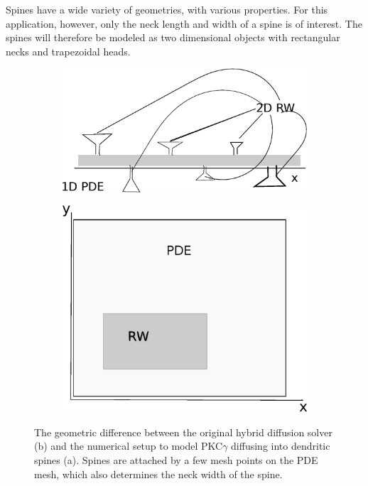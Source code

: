 \noindent Spines have a wide variety of geometries, with various properties. For this application, however, only the neck length and width of a spine is of interest. The spines will therefore be modeled as two dimensional objects with rectangular necks and trapezoidal heads. 
\begin{figure}[H]
 \centering
 \begin{subfigure}{0.48\textwidth}
  \includegraphics[width=\textwidth]{Figures/dendrite_spine_model.eps}
  \caption{}
 \end{subfigure}
 \begin{subfigure}{0.48\textwidth}
  \includegraphics[width=\textwidth]{Figures/hybrid_model_principle.eps}
  \caption{}
 \end{subfigure}
 \caption[Difference between hybrid diffusion solver and dendrite - spine diffusion model]{The geometric difference between the original hybrid diffusion solver (b) and the numerical setup to model PKC$\gamma$ diffusing into dendritic spines (a). Spines are attached by a few mesh points on the PDE mesh, which also determines the neck width of the spine.}
 \label{application:geometry_difference}
\end{figure}


